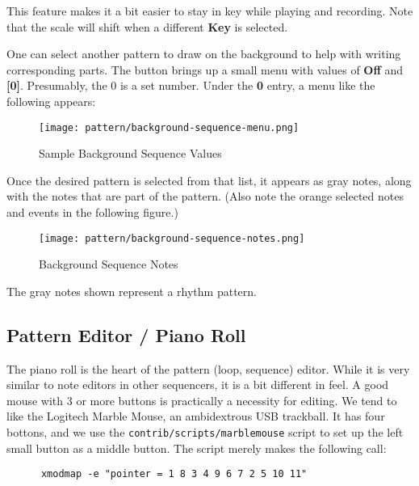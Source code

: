    This feature makes it a bit easier to stay in key while playing and
   recording.  Note that the scale will shift when a different
   \textbf{Key} is selected.

   One can select another pattern to draw on the background to help with
   writing corresponding parts.
   The button brings up a small menu with values of \textbf{Off} and
   \textbf{[0]}.  Presumably, the 0 is a set number.  Under the \textbf{0}
   entry, a menu like the following appears:

\begin{figure}[H]
   \centering 
   \texttt{[image: pattern/background-sequence-menu.png]}
   \caption{Sample Background Sequence Values}
   \label{fig:pattern_editor_background_sequence_menu}
\end{figure}

   Once the desired pattern is selected from that list, it appears as
   gray notes, along with the notes that are part of the pattern.  (Also
   note the orange selected notes and events in the following figure.)

\begin{figure}[H]
   \centering 
   \texttt{[image: pattern/background-sequence-notes.png]}
   \caption{Background Sequence Notes}
   \label{fig:pattern_editor_background_sequence_notes}
\end{figure}

   The gray notes shown represent a rhythm pattern.

\subsection{Pattern Editor / Piano Roll}
\label{subsec:seq24_pattern_editor_piano_roll}

   The piano roll is the heart of the pattern (loop, sequence) editor.
   While it is very similar to note editors in other sequencers, it is a bit
   different in feel.  A good mouse with 3 or more buttons is practically a
   necessity for editing.  We tend to like the Logitech Marble Mouse, an
   ambidextrous USB trackball.  It has four bottons, and we use the
   \texttt{contrib/scripts/marblemouse} script to set up the left small
   button as a middle button.  The script merely makes the following call:

   \begin{verbatim}
      xmodmap -e "pointer = 1 8 3 4 9 6 7 2 5 10 11"
   \end{verbatim}

